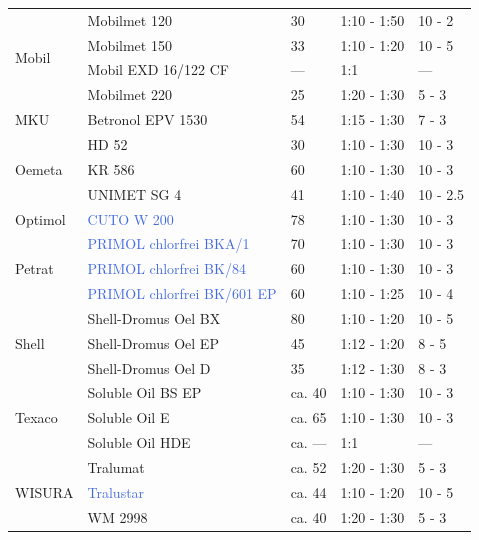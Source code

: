 \begin{longtable}{|p{3.5cm}|p{4.5cm}|p{1.5cm}|p{2.7cm}|p{2cm}|}
    \multirow{4}{*}{Mobil} & Mobilmet 120 & 30 & 1:10 - 1:50 & 10 - 2 \\
    \cline{2-5}
    & Mobilmet 150 & 33 & 1:10 - 1:20 & 10 - 5 \\
    \cline{2-5}
    & Mobil EXD 16/122 CF & --- & 1:1 & --- \\
    \cline{2-5}
    & Mobilmet 220 & 25 & 1:20 - 1:30 & 5 - 3 \\
    \hline

    \multirow{1}{*}{MKU} & Betronol EPV 1530 & 54 & 1:15 - 1:30 & 7 - 3 \\
    \hline

    \multirow{3}{*}{Oemeta} & HD 52 & 30 & 1:10 - 1:30 & 10 - 3 \\
    \cline{2-5}
    & KR 586 & 60 & 1:10 - 1:30 & 10 - 3 \\
    \cline{2-5}
    & UNIMET SG 4 & 41 & 1:10 - 1:40 & 10 - 2.5 \\
    \hline

    \multirow{1}{*}{Optimol} & \textcolor{RoyalBlue}{CUTO W 200} & 78 & 1:10 - 1:30 & 10 - 3 \\
    \hline

    \multirow{3}{*}{Petrat} & \textcolor{RoyalBlue}{PRIMOL chlorfrei BKA/1} & 70 & 1:10 - 1:30 & 10 - 3 \\
    \cline{2-5}
    & \textcolor{RoyalBlue}{PRIMOL chlorfrei BK/84} & 60 & 1:10 - 1:30 & 10 - 3 \\
    \cline{2-5}
    & \textcolor{RoyalBlue}{PRIMOL chlorfrei BK/601 EP} & 60 & 1:10 - 1:25 & 10 - 4 \\
    \hline

    \multirow{3}{*}{Shell} & Shell-Dromus Oel BX & 80 & 1:10 - 1:20 & 10 - 5 \\
    \cline{2-5}
    & Shell-Dromus Oel EP & 45 & 1:12 - 1:20 & 8 - 5 \\
    \cline{2-5}
    & Shell-Dromus Oel D & 35 & 1:12 - 1:30 & 8 - 3 \\
    \hline

    \multirow{3}{*}{Texaco} & Soluble Oil BS EP & ca. 40 & 1:10 - 1:30 & 10 - 3 \\
    \cline{2-5}
    & Soluble Oil E & ca. 65 & 1:10 - 1:30 & 10 - 3 \\
    \cline{2-5}
    & Soluble Oil HDE & ca. --- & 1:1 & --- \\
    \hline
    \multirow{3}{*}{WISURA} & Tralumat & ca. 52 & 1:20 - 1:30 & 5 - 3 \\
    \cline{2-5}
    & \textcolor{RoyalBlue}{Tralustar} & ca. 44 & 1:10 - 1:20 & 10 - 5 \\
    \cline{2-5}
    & WM 2998 & ca. 40 & 1:20 - 1:30 & 5 - 3 \\
    \hline


\end{longtable}
